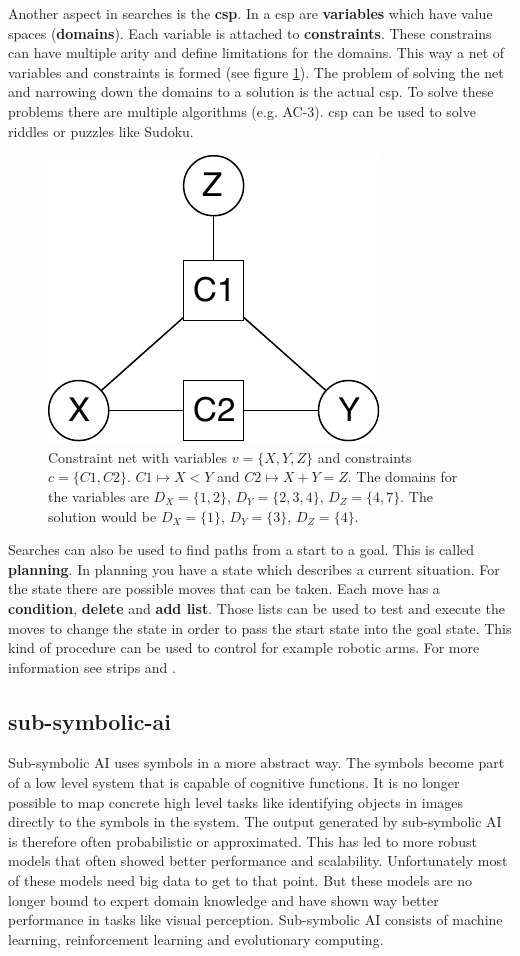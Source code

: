 \documentclass[jou,apacite]{apa6}
\begin{document}
Another aspect in searches is the \textbf{\gls{csp}}. In a \gls{csp} are \textbf{variables} which have value spaces (\textbf{domains}). Each variable is attached to \textbf{constraints}. These constrains can have multiple arity and define limitations for the domains. 
This way a net of variables and constraints is formed (see figure \ref{fig:cs-net}). The problem of solving the net and narrowing down the domains to a solution is the actual \gls{csp}. To solve these problems there are multiple algorithms (e.g. AC-3). \gls{csp} can be used to solve riddles or puzzles like Sudoku.

\begin{figure}[!htb]
\centering
	\includegraphics[width=.25\textwidth]{csp.pdf}
\caption[Constraint net]{Constraint net with variables $v = \{X,Y,Z\}$ and constraints $c = \{C1, C2\}$. $C1 \mapsto X < Y$ and $C2 \mapsto X + Y = Z$. The domains for the variables are $D_X = \{1,2\}$, $D_Y = \{2,3,4\}$, $D_Z = \{4,7\}$. The solution would be $D_X = \{1\}$, $D_Y = \{3\}$, $D_Z = \{4\}$.}
\label{fig:cs-net}
\end{figure}

Searches can also be used to find paths from a start to a goal. This is called \textbf{planning}. In planning you have a state which describes a current situation. For the state there are possible moves that can be taken. Each move has a \textbf{condition}, \textbf{delete} and \textbf{add list}. Those lists can be used to test and execute the moves to change the state in order to pass the start state into the goal state. This kind of procedure can be used to control for example robotic arms. For more information see \gls{strips} and \cite{Nilsson1982}.

\subsection{\gls{sub-symbolic-ai}}
Sub-symbolic AI uses symbols in a more abstract way. The symbols become part of a low level system that is capable of cognitive functions. It is no longer possible to map concrete high level tasks like identifying objects in images directly to the symbols in the system. The output generated by sub-symbolic AI is therefore often probabilistic or approximated. This has led to more robust models that often showed better performance and scalability. Unfortunately most of these models need big data to get to that point. But these models are no longer bound to expert domain knowledge and have shown way better performance in tasks like visual perception. Sub-symbolic AI consists of machine learning, reinforcement learning and evolutionary computing.
\end{document}
